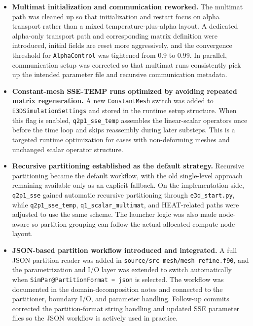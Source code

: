 \documentclass[11pt,a4paper]{article}
\begin{document}
\begin{itemize}[leftmargin=*,itemsep=0.9em]
  \item \textbf{Multimat initialization and communication reworked.}
  The multimat path was cleaned up so that initialization and restart focus on alpha transport rather than a mixed temperature-plus-alpha layout. A dedicated alpha-only transport path and corresponding matrix definition were introduced, initial fields are reset more aggressively, and the convergence threshold for \texttt{AlphaControl} was tightened from 0.9 to 0.99. In parallel, communication setup was corrected so that multimat runs consistently pick up the intended parameter file and recursive communication metadata.

  \item \textbf{Constant-mesh SSE-TEMP runs optimized by avoiding repeated matrix regeneration.}
  A new \texttt{ConstantMesh} switch was added to \texttt{E3DSimulationSettings} and stored in the runtime setup structure. When this flag is enabled, \texttt{q2p1\_sse\_temp} assembles the linear-scalar operators once before the time loop and skips reassembly during later substeps. This is a targeted runtime optimization for cases with non-deforming meshes and unchanged scalar operator structure.

  \item \textbf{Recursive partitioning established as the default strategy.}
  Recursive partitioning became the default workflow, with the old single-level approach remaining available only as an explicit fallback. On the implementation side, \texttt{q2p1\_sse} gained automatic recursive partitioning through \texttt{e3d\_start.py}, while \texttt{q2p1\_sse\_temp}, \texttt{q1\_scalar\_multimat}, and HEAT-related paths were adjusted to use the same scheme. The launcher logic was also made node-aware so partition grouping can follow the actual allocated compute-node layout.

  \item \textbf{JSON-based partition workflow introduced and integrated.}
  A full JSON partition reader was added in \texttt{source/src\_mesh/mesh\_refine.f90}, and the parametrization and I/O layer was extended to switch automatically when \texttt{SimPar@PartitionFormat = json} is selected. The workflow was documented in the domain-decomposition notes and connected to the partitioner, boundary I/O, and parameter handling. Follow-up commits corrected the partition-format string handling and updated SSE parameter files so the JSON workflow is actively used in practice.
\end{itemize}
\end{document}
